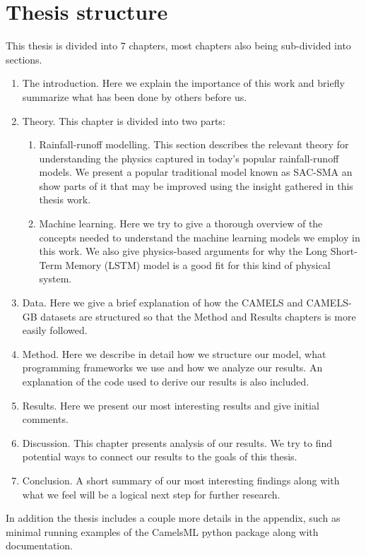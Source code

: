 \section{Thesis structure}
This thesis is divided into 7 chapters, most chapters also being sub-divided into
sections. 
\begin{enumerate}
\item  The introduction. Here we explain the importance of this work and briefly summarize what has been done by others before us.
\item Theory. This chapter is divided into two parts:
    \begin{enumerate}
    \item Rainfall-runoff modelling. This section describes the relevant theory for understanding the physics captured in today's popular rainfall-runoff models. We present a popular traditional model known as SAC-SMA an show parts of it that may be improved using the insight gathered in this thesis work.
    \item Machine learning. Here we try to give a thorough overview of the concepts needed to understand the machine learning models we employ in this work. We also give physics-based arguments for why the Long Short-Term Memory (LSTM) model is a good fit for this kind of physical system.
    \end{enumerate}
    \item Data. Here we give a brief explanation of how the CAMELS and CAMELS-GB 
    datasets are structured so that the Method and Results chapters is more easily followed.
    \item Method. Here we describe in detail how we structure our model, what programming frameworks we use and how we analyze our results. An explanation of the code used to derive our results is also included.
    \item Results. Here we present our most interesting results and give initial comments.
    \item Discussion. This chapter presents analysis of our results. We try to find potential ways to connect our results to the goals of this thesis.
    \item Conclusion. A short summary of our most interesting findings along with what we feel will be a logical next step for further research.
\end{enumerate}
In addition the thesis includes a couple more details in the appendix, such as 
minimal running examples of the CamelsML python package along with documentation.
\nocite{4160265}
\nocite{mckinney-proc-scipy-2010}
\nocite{2020NumPy-Array}
\nocite{2020SciPy-NMeth}
\nocite{NEURIPS2019_9015}
\nocite{Prechelt1998}
\nocite{elemstatlearn}
